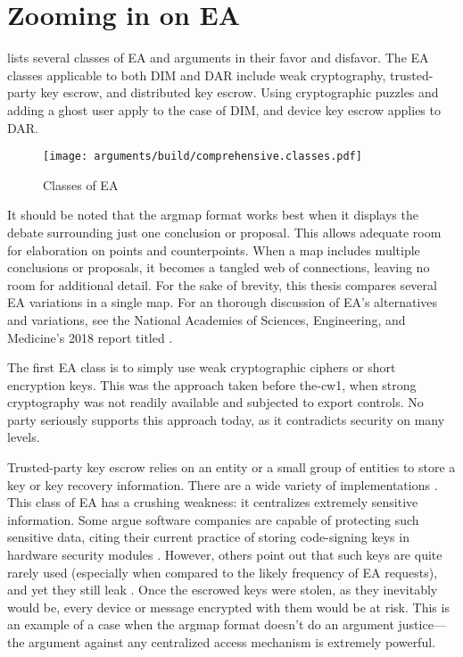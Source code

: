 \section{Zooming in on EA}
\label{sec-ea-types}

 lists several classes of \ac{EA} and arguments in their favor and disfavor. The \ac{EA} classes
applicable to both \ac{DIM} and \ac{DAR} include weak cryptography, trusted-party key escrow, and distributed key
escrow. Using cryptographic puzzles and adding a ghost user apply to the case of \ac{DIM}, and device key escrow applies
to \ac{DAR}.

\begin{sidewaysfigure}[p!]
  \centering\CaptionFontSize
  \texttt{[image: arguments/build/comprehensive.classes.pdf]}
  \caption{Classes of EA}
  \label{fig-arg-classes}
\end{sidewaysfigure}

It should be noted that the \ac{argmap} format works best when it displays the debate surrounding just one conclusion or
proposal. This allows adequate room for elaboration on points and counterpoints. When a map includes multiple
conclusions or proposals, it becomes a tangled web of connections, leaving no room for additional detail. For the sake
of brevity, this thesis compares several \ac{EA} variations in a single map. For an thorough discussion of \ac{EA}'s
alternatives and variations, see the National Academies of Sciences, Engineering, and Medicine's 2018 report titled
 \cite{committee_decrypting_2018}.

The first \ac{EA} class is to simply use weak cryptographic ciphers or short encryption keys. This was the approach
taken before \ac{the-cw1}, when strong cryptography was not readily available and subjected to export controls. No party
seriously supports this approach today, as it contradicts security on many levels.

Trusted-party key escrow relies on an entity or a small group of entities to store a key or key recovery information.
There are a wide variety of implementations \cite{denning_taxonomy_1996}. This class of \ac{EA} has a crushing weakness:
it centralizes extremely sensitive information. Some argue software companies are capable of protecting such sensitive
data, citing their current practice of storing code-signing keys in hardware security modules \cite{ozzie_2018}.
However, others point out that such keys are quite rarely used (especially when compared to the likely frequency of
\ac{EA} requests), and yet they still leak \cite{green_2018}. Once the escrowed keys were stolen, as they inevitably
would be, every device or message encrypted with them would be at risk. This is an example of a case when the
\ac{argmap} format doesn't do an argument justice---the argument against any centralized access mechanism is extremely
powerful.

